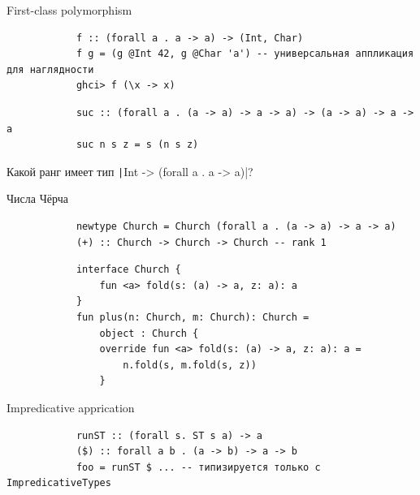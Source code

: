     \begin{frame}[fragile]{First-class polymorphism}
        \pause
        \begin{verbatim}
            f :: (forall a . a -> a) -> (Int, Char)
            f g = (g @Int 42, g @Char 'a') -- универсальная аппликация для наглядности
            ghci> f (\x -> x)
        \end{verbatim}

        \pause\hspace{2em}
        \begin{verbatim}
            suc :: (forall a . (a -> a) -> a -> a) -> (a -> a) -> a -> a
            suc n s z = s (n s z)
        \end{verbatim}
        \pause\hspace{2em}
        Какой ранг имеет тип \texttt|Int -> (forall a . a -> a)|?
    \end{frame}

    \begin{frame}[fragile]{Числа Чёрча}
        \pause
        \begin{verbatim}
            newtype Church = Church (forall a . (a -> a) -> a -> a)
            (+) :: Church -> Church -> Church -- rank 1
        \end{verbatim}

        \pause\hspace{2em}
        \begin{verbatim}
            interface Church {
                fun <a> fold(s: (a) -> a, z: a): a
            }
            fun plus(n: Church, m: Church): Church =
                object : Church {
                override fun <a> fold(s: (a) -> a, z: a): a =
                    n.fold(s, m.fold(s, z))
                }
        \end{verbatim}
    \end{frame}

    \begin{frame}[fragile]{Impredicative apprication}
        \pause
        \begin{verbatim}
            runST :: (forall s. ST s a) -> a
            ($) :: forall a b . (a -> b) -> a -> b
            foo = runST $ ... -- типизируется только с ImpredicativeTypes
        \end{verbatim}
    \end{frame}

